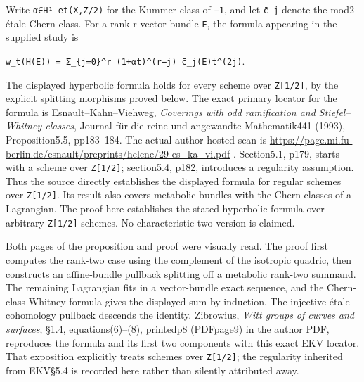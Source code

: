 \documentclass[
  10pt,
]{article}
\begin{document}
Write
\texttt{\small α∈H¹\_\allowbreak{}et(\allowbreak{}X,\allowbreak{}Z/\allowbreak{}2)\allowbreak{}}
for the Kummer class of \texttt{\small −1}, and let
\texttt{\small c̄\_\allowbreak{}j} denote the mod2 étale Chern class. For
a rank-r vector bundle \texttt{\small E}, the formula appearing in the
supplied study is

\texttt{\small w\_\allowbreak{}t(\allowbreak{}H(\allowbreak{}E)\allowbreak{})\allowbreak{} =\allowbreak{} Σ\_\allowbreak{}\{j=\allowbreak{}0\}\textasciicircum{}r (\allowbreak{}1+\allowbreak{}αt)\allowbreak{}\textasciicircum{}(\allowbreak{}r−j)\allowbreak{} c̄\_\allowbreak{}j(\allowbreak{}E)\allowbreak{}t\textasciicircum{}(\allowbreak{}2j)\allowbreak{}}.

The displayed hyperbolic formula holds for every scheme over
\texttt{\small Z[\allowbreak{}1/\allowbreak{}2]\allowbreak{}}, by the
explicit splitting morphisms proved below. The exact primary locator for
the formula is Esnault--Kahn--Viehweg, \emph{Coverings with odd
ramification and Stiefel--Whitney classes}, Journal für die reine und
angewandte Mathematik441 (1993), Proposition5.5, pp183--184. The actual
author-hosted scan is
\url{https://page.mi.fu-berlin.de/esnault/preprints/helene/29-es_ka_vi.pdf}
. Section5.1, p179, starts with a scheme over
\texttt{\small Z[\allowbreak{}1/\allowbreak{}2]\allowbreak{}};
section5.4, p182, introduces a regularity assumption. Thus the source
directly establishes the displayed formula for regular schemes over
\texttt{\small Z[\allowbreak{}1/\allowbreak{}2]\allowbreak{}}. Its
result also covers metabolic bundles with the Chern classes of a
Lagrangian. The proof here establishes the stated hyperbolic formula
over arbitrary
\texttt{\small Z[\allowbreak{}1/\allowbreak{}2]\allowbreak{}}-schemes.
No characteristic-two version is claimed.

Both pages of the proposition and proof were visually read. The proof
first computes the rank-two case using the complement of the isotropic
quadric, then constructs an affine-bundle pullback splitting off a
metabolic rank-two summand. The remaining Lagrangian fits in a
vector-bundle exact sequence, and the Chern-class Whitney formula gives
the displayed sum by induction. The injective étale-cohomology pullback
descends the identity. Zibrowius, \emph{Witt groups of curves and
surfaces}, §1.4, equations(6)--(8), printedp8 (PDFpage9) in the author
PDF, reproduces the formula and its first two components with this exact
EKV locator. That exposition explicitly treats schemes over
\texttt{\small Z[\allowbreak{}1/\allowbreak{}2]\allowbreak{}}; the
regularity inherited from EKV§5.4 is recorded here rather than silently
attributed away.
\end{document}
